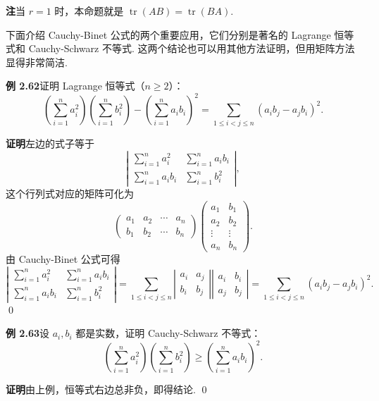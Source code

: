 \documentclass[UTF8, 12pt, fontset=fandol, oneside]{ctexart}
\begin{document}
\noindent\textbf{注}\quad 当 $r=1$ 时，本命题就是 $\operatorname{tr}(AB)=\operatorname{tr}(BA)$.

下面介绍 Cauchy-Binet 公式的两个重要应用，它们分别是著名的 Lagrange 恒等式和 Cauchy-Schwarz 不等式. 这两个结论也可以用其他方法证明，但用矩阵方法显得非常简洁.

\noindent\textbf{例 2.62}\quad 证明 Lagrange 恒等式（$n\ge2$）：
\[
\left(\sum_{i=1}^n a_i^2\right)
\left(\sum_{i=1}^n b_i^2\right)
-\left(\sum_{i=1}^n a_ib_i\right)^2
=\sum_{1\le i<j\le n}(a_ib_j-a_jb_i)^2.
\]

\noindent\textbf{证明}\quad 左边的式子等于
\[
\left|
\begin{array}{cc}
\sum\limits_{i=1}^n a_i^2 & \sum\limits_{i=1}^n a_ib_i\\
\sum\limits_{i=1}^n a_ib_i & \sum\limits_{i=1}^n b_i^2
\end{array}
\right|,
\]
这个行列式对应的矩阵可化为
\[
\left(
\begin{array}{cccc}
a_1 & a_2 & \cdots & a_n\\
b_1 & b_2 & \cdots & b_n
\end{array}
\right)
\left(
\begin{array}{cc}
a_1 & b_1\\
a_2 & b_2\\
\vdots & \vdots\\
a_n & b_n
\end{array}
\right).
\]
由 Cauchy-Binet 公式可得
\[
\left|
\begin{array}{cc}
\sum\limits_{i=1}^n a_i^2 & \sum\limits_{i=1}^n a_ib_i\\
\sum\limits_{i=1}^n a_ib_i & \sum\limits_{i=1}^n b_i^2
\end{array}
\right|
=
\sum_{1\le i<j\le n}
\left|
\begin{array}{cc}
a_i & a_j\\
b_i & b_j
\end{array}
\right|
\left|
\begin{array}{cc}
a_i & b_i\\
a_j & b_j
\end{array}
\right|
=\sum_{1\le i<j\le n}(a_ib_j-a_jb_i)^2.
\]
\qed

\noindent\textbf{例 2.63}\quad 设 $a_i,b_i$ 都是实数，证明 Cauchy-Schwarz 不等式：
\[
\left(\sum_{i=1}^n a_i^2\right)
\left(\sum_{i=1}^n b_i^2\right)
\ge
\left(\sum_{i=1}^n a_ib_i\right)^2.
\]

\noindent\textbf{证明}\quad 由上例，恒等式右边总非负，即得结论. \qed
\end{document}
